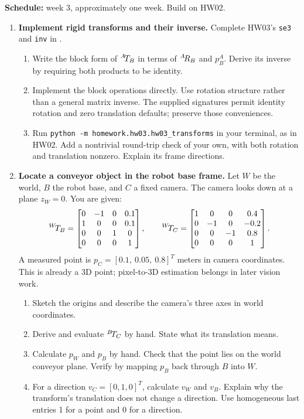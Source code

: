 

\textbf{Schedule:} week 3, approximately one week. Build on HW02. \conventions

\begin{enumerate}
\item \textbf{Implement rigid transforms and their inverse.}
Complete HW03's \texttt{se3} and \texttt{inv} in
.
\begin{enumerate}
\item Write the block form of ${}^{A}\!T_{B}$ in terms of ${}^{A}\!R_{B}$ and
$p^A_B$. Derive its inverse by requiring both products to be identity.
\item Implement the block operations directly. Use rotation structure rather
than a general matrix inverse. The supplied signatures permit identity
rotation and zero translation defaults; preserve those conveniences.
\item Run \texttt{python -m homework.hw03.hw03\_transforms} in your
 terminal, as in HW02. Add a nontrivial round-trip check of your own, with both
rotation and translation nonzero. Explain its frame directions.
\end{enumerate}

\item \textbf{Locate a conveyor object in the robot base frame.}
Let $W$ be the world, $B$ the robot base, and $C$ a fixed camera.
The camera looks down at a plane $z_W=0$. You are given:
\[
{}^{W}\!T_{B}=\begin{bmatrix}
0&-1&0&0.1\\1&0&0&0.1\\0&0&1&0\\0&0&0&1
\end{bmatrix},\qquad
{}^{W}\!T_{C}=\begin{bmatrix}
1&0&0&0.4\\0&-1&0&-0.2\\0&0&-1&0.8\\0&0&0&1
\end{bmatrix}.
\]
A measured point is $p_C=[0.1,\ 0.05,\ 0.8]^T$ meters in camera coordinates.
This is already a 3D point; pixel-to-3D estimation belongs in later vision work.
\begin{enumerate}
\item Sketch the origins and describe the camera's three axes in world coordinates.
\item Derive and evaluate ${}^{B}\!T_{C}$ by hand. State what its translation means.
\item Calculate $p_W$ and $p_B$ by hand. Check that the point lies on the
world conveyor plane. Verify by mapping $p_B$ back through $B$ into $W$.
\item For a direction $v_C=[0,1,0]^T$, calculate $v_W$ and $v_B$.
Explain why the transform's translation does not change a direction.
Use homogeneous last entries 1 for a point and 0 for a direction.
\end{enumerate}
\end{enumerate}


